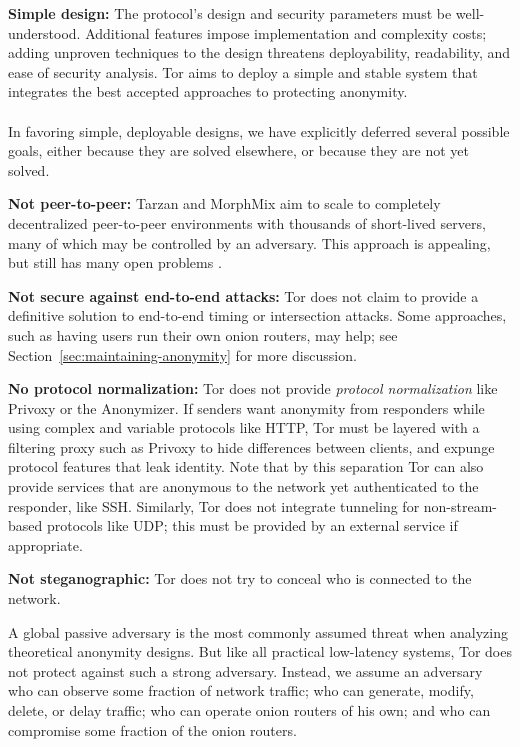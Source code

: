 \documentclass[times,10pt,twocolumn]{article}
\begin{document}
\textbf{Simple design:} The protocol's design and security
parameters must be well-understood. Additional features impose implementation
and complexity costs; adding unproven techniques to the design threatens
deployability, readability, and ease of security analysis. Tor aims to
deploy a simple and stable system that integrates the best accepted
approaches to protecting anonymity.\\

\label{subsec:non-goals}\\
In favoring simple, deployable designs, we have explicitly deferred
several possible goals, either because they are solved elsewhere, or because
they are not yet solved.

\textbf{Not peer-to-peer:} Tarzan and MorphMix aim to scale to completely
decentralized peer-to-peer environments with thousands of short-lived
servers, many of which may be controlled by an adversary.  This approach
is appealing, but still has many open problems
\cite{tarzan:ccs02,morphmix:fc04}.

\textbf{Not secure against end-to-end attacks:} Tor does not claim
to provide a definitive solution to end-to-end timing or intersection
attacks. Some approaches, such as having users run their own onion routers, 
may help;
see Section~\ref{sec:maintaining-anonymity} for more discussion.

\textbf{No protocol normalization:} Tor does not provide \emph{protocol
normalization} like Privoxy or the Anonymizer. If senders want anonymity from
responders while using complex and variable
protocols like HTTP, Tor must be layered with a filtering proxy such
as Privoxy to hide differences between clients, and expunge protocol
features that leak identity.
Note that by this separation Tor can also provide services that
are anonymous to the network yet authenticated to the responder, like
SSH. Similarly, Tor does not integrate
tunneling for non-stream-based protocols like UDP; this must be
provided by an external service if appropriate.

\textbf{Not steganographic:} Tor does not try to conceal who is connected
to the network.

\label{subsec:threat-model}

A global passive adversary is the most commonly assumed threat when
analyzing theoretical anonymity designs. But like all practical
low-latency systems, Tor does not protect against such a strong
adversary. Instead, we assume an adversary who can observe some fraction
of network traffic; who can generate, modify, delete, or delay
traffic;  who can operate onion routers of his own; and who can
compromise some fraction of the onion routers.
\end{document}
